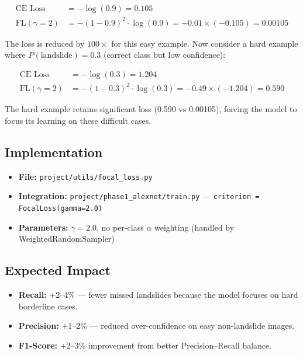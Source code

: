 \documentclass[11pt]{article}
\begin{document}
\begin{align*}
\text{CE Loss} &= -\log(0.9) = 0.105 \\
\text{FL}(\gamma{=}2) &= -(1-0.9)^2 \cdot \log(0.9) = -0.01 \times (-0.105) = \mathbf{0.00105}
\end{align*}

The loss is reduced by $100\times$ for this easy example.
Now consider a hard example where $P(\text{landslide}) = 0.3$ (correct class but low confidence):

\begin{align*}
\text{CE Loss} &= -\log(0.3) = 1.204 \\
\text{FL}(\gamma{=}2) &= -(1-0.3)^2 \cdot \log(0.3) = -0.49 \times (-1.204) = \mathbf{0.590}
\end{align*}

The hard example retains significant loss (0.590 vs 0.00105), forcing the model to focus its learning on these difficult cases.

\subsection{Implementation}

\begin{itemize}[noitemsep]
    \item \textbf{File:} \texttt{project/utils/focal\_loss.py}
    \item \textbf{Integration:} \texttt{project/phase1\_alexnet/train.py} --- \texttt{criterion = FocalLoss(gamma=2.0)}
    \item \textbf{Parameters:} $\gamma = 2.0$, no per-class $\alpha$ weighting (handled by WeightedRandomSampler)
\end{itemize}

\subsection{Expected Impact}

\begin{itemize}[noitemsep]
    \item \textbf{Recall:} +2--4\% --- fewer missed landslides because the model focuses on hard borderline cases.
    \item \textbf{Precision:} +1--2\% --- reduced over-confidence on easy non-landslide images.
    \item \textbf{F1-Score:} +2--3\% improvement from better Precision--Recall balance.
\end{itemize}
\end{document}
